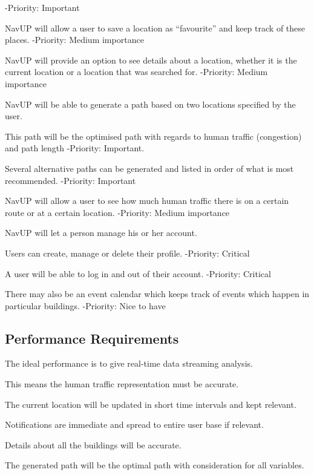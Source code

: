 \documentclass[12pt,a4paper]{article}
\begin{document}
\begin{RequirementsEnum}
\begin{RequirementsEnum}
    -Priority: Important
    \end{RequirementsEnum}     
\item NavUP will allow a user to save a location as “favourite” and keep track of these places.\newline
    -Priority: Medium importance
\item NavUP will provide an option to see details about a location, whether it is the current location or a location that was searched for.\newline
    -Priority: Medium importance
\item NavUP will be able to generate a path based on two locations specified by the user.
	\begin{RequirementsEnum}     
    	\item This path will be the optimised path with regards to human traffic (congestion) and path length\newline
	-Priority: Important.
    	\item Several alternative paths can be generated and listed in order of what is most recommended.
    -Priority: Important
    \end{RequirementsEnum}     
\item NavUP will allow a user to see how much human traffic there is on a certain route or at a certain location.\newline
    -Priority: Medium importance
\item NavUP will let a person manage his or her account.\newline
	\begin{RequirementsEnum}     
    	\item Users can create, manage or delete their profile.
	-Priority: Critical
    	\item A user will be able to log in and out of their account.
    -Priority: Critical
    \end{RequirementsEnum}  
\item There may also be an event calendar which keeps track of events which happen in particular buildings.\newline
    -Priority: Nice to have    
    
	\subsection{Performance Requirements}
\item The ideal performance is to give real-time data streaming analysis. 
	\begin{RequirementsEnum}	
    	\item This means the human traffic representation must be accurate.
	    \item The current location will be updated in short time intervals and kept relevant.
	    \item Notifications are immediate and spread to entire user base if relevant.
	\end{RequirementsEnum}    
\item Details about all the buildings will be accurate.
\item The generated path will be the optimal path with consideration for all variables.

\end{RequirementsEnum}
\end{document}

